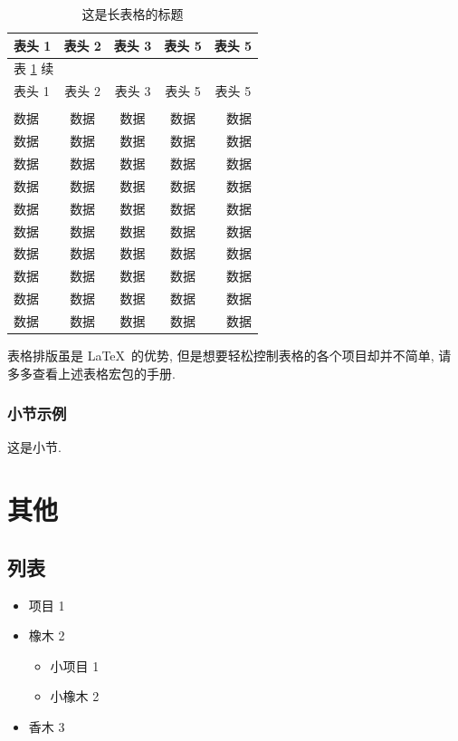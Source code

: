 \documentclass[final]{ncuthesis}
\begin{document}
\begin{longtable}{lcccr}
\caption{这是长表格的标题}\label{tab:longtab}\\
\toprule
表头 1 & 表头 2 & 表头 3 & 表头 5 & \multicolumn{1}{c}{表头 5}\\
\midrule
\endfirsthead
\multicolumn{4}{l}{\small 表 \ref{tab:longtab} 续}\\
\toprule
表头 1 & 表头 2 & 表头 3 & 表头 5 & \multicolumn{1}{c}{表头 5}\\
\midrule
\endhead
\bottomrule
\endfoot
\bottomrule
\multicolumn{5}{l}{\small 注: 这是长表格测试. }\\
\endlastfoot
数据 & 数据 & 数据 & 数据 & 数据\\
数据 & 数据 & 数据 & 数据 & 数据\\
数据 & 数据 & 数据 & 数据 & 数据\\
数据 & 数据 & 数据 & 数据 & 数据\\
数据 & 数据 & 数据 & 数据 & 数据\\
数据 & 数据 & 数据 & 数据 & 数据\\
数据 & 数据 & 数据 & 数据 & 数据\\
数据 & 数据 & 数据 & 数据 & 数据\\
数据 & 数据 & 数据 & 数据 & 数据\\
数据 & 数据 & 数据 & 数据 & 数据\\
\end{longtable}

表格排版虽是 \LaTeX\ 的优势, 但是想要轻松控制表格的各个项目却并不简单, 请多多查看上述表格宏包的手册. 
\subsection{小节示例}
这是小节. 
\chapter{其他}
\section{列表}
\begin{itemize}
\item 项目 1
\item 橡木 2
\begin{itemize}
  \item 小项目 1
  \item 小橡木 2
\end{itemize}
\item 香木 3
\end{itemize}
\end{document}
